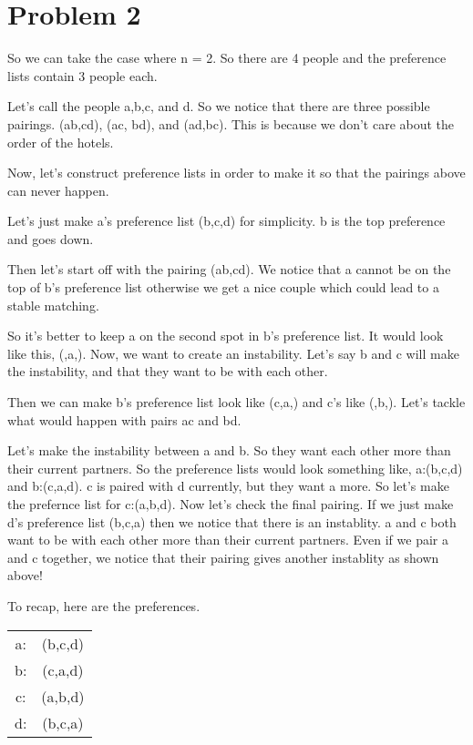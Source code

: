 \documentclass{article}
\begin{document}
\pagebreak
\section{Problem 2}

So we can take the case where n = 2. So there are 4 people and the preference lists contain 3 people each. 
\vspace{1mm}

Let's call the people a,b,c, and d. So we notice that there are three possible pairings. (ab,cd), (ac, bd), and (ad,bc). This is because we don't care about the order of the hotels. 
\vspace{1mm}

Now, let's construct preference lists in order to make it so that the pairings above can never happen. 

Let's just make a's preference list (b,c,d) for simplicity. b is the top preference and goes down.

Then let's start off with the pairing (ab,cd). We notice that a cannot be on the top of b's preference list otherwise we get a nice couple which could lead to a stable matching.
\vspace{1mm}

So it's better to keep a on the second spot in b's preference list. It would look like this, (,a,). Now, we want to create an instability. Let's say b and c will make the instability, and that they want to be with each other. 

Then we can make b's preference list look like (c,a,) and c's like (,b,). Let's tackle what would happen with pairs ac and bd. 

Let's make the instability between a and b. So they want each other more than their current partners. So the preference lists would look something like, a:(b,c,d) and b:(c,a,d). c is paired with d currently, but they want a more. So let's make the prefernce list for c:(a,b,d). 
\vspace{1mm}
Now let's check the final pairing. If we just make d's preference list (b,c,a) then we notice that there is an instablity. a and c both want to be with each other more than their current partners. 
Even if we pair a and c together, we notice that their pairing gives another instablity as shown above! 

To recap, here are the preferences. 


\begin{center}
    \begin{tabular}{ c c  }
        a:  & (b,c,d) \\ 
        b:  &  (c,a,d) \\  
        c:  &  (a,b,d) \\    
        d:  & (b,c,a)  \\ 
    \end{tabular}
    \end{center}
\end{document}
